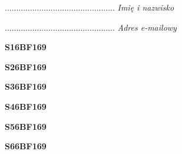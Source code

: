 \begin{turn}{90}\begin{minipage}{\linewidth} \vspace{20mm} ................................................  \textit{Imię i nazwisko}\end{minipage}\end{turn}

\begin{turn}{90}\begin{minipage}{\linewidth} \vspace{20mm} ................................................  \textit{Adres e-mailowy}\end{minipage}\end{turn}

\begin{turn}{90}\huge \begin{minipage}{\linewidth} \vspace{10mm}\textbf{S16BF169}\end{minipage}\end{turn}

\begin{turn}{90}\huge \begin{minipage}{\linewidth} \vspace{10mm}\textbf{S26BF169}\end{minipage}\end{turn}

\begin{turn}{90}\huge \begin{minipage}{\linewidth} \vspace{10mm}\textbf{S36BF169}\end{minipage}\end{turn}

\begin{turn}{90}\huge \begin{minipage}{\linewidth} \vspace{10mm}\textbf{S46BF169}\end{minipage}\end{turn}

\begin{turn}{90}\huge \begin{minipage}{\linewidth} \vspace{10mm}\textbf{S56BF169}\end{minipage}\end{turn}

\begin{turn}{90}\huge \begin{minipage}{\linewidth} \vspace{10mm}\textbf{S66BF169}\end{minipage}\end{turn}


